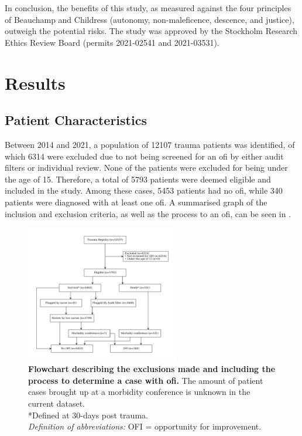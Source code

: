 \documentclass[12pt, a4paper]{article}
\begin{document}
In conclusion, the benefits of this study, as measured against the four principles of Beauchamp and Childress
(autonomy, non-maleficence, descence, and justice), outweigh the potential risks. The study was approved by the
Stockholm Research Ethics Review Board (permits 2021-02541 and 2021-03531).

\section{Results}
\subsection{Patient Characteristics}

Between 2014 and 2021, a population of \num{12107} trauma patients was identified, of which \num{6314} were excluded
due to not being screened for an \acrshort{ofi} by either audit filters or individual review. None of the patients were
excluded for being under the age of 15. Therefore, a total of \num{5793} patients were deemed eligible and included in
the study. Among these cases, \num{5453} patients had no \acrshort{ofi}, while \num{340} patients were diagnosed with
at least one \acrshort{ofi}. A summarised graph of the inclusion and exclusion criteria, as well as the process to an
\acrshort{ofi}, can be seen in .

\begin{figure}
	\centering
	\includegraphics[width=0.6\textwidth]{figures/flowchart.pdf}
	\caption{\textbf{Flowchart describing the exclusions made and including the process to determine a case with \acrshort{ofi}.} The amount of patient cases brought up at a morbidity conference is unknown in the current dataset.\\
		*Defined at 30-days post trauma.\\
		\textit{Definition of abbreviations:} OFI = opportunity for improvement.}
	\label{fig:flowchart}
\end{figure}
\end{document}
